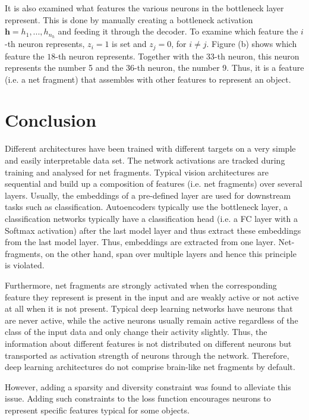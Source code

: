 It is also examined what features the various neurons in the bottleneck layer represent.
This is done by manually creating a bottleneck activation $\boldsymbol{h} = h_1, ..., h_{n_h}$ and feeding it through the decoder.
To examine which feature the $i$-th neuron represents, $z_i=1$ is set and $z_{j}=0$, for $i \neq j$.
Figure  (b) shows which feature the $18$-th neuron represents. Together with the $33$-th neuron, this neuron represents the number 5 and the $36$-th neuron, the number 9.
Thus, it is a feature (i.e. a net fragment) that assembles with other features to represent an object.

\section{Conclusion}
Different architectures have been trained with different targets on a very simple and easily interpretable data set.
The network activations are tracked during training and analysed for net fragments.
Typical vision architectures are sequential and build up a composition of features (i.e. net fragments) over several layers.
Usually, the embeddings of a pre-defined layer are used for downstream tasks such as classification.
Autoencoders typically use the bottleneck layer, a classification networks typically have a classification head (i.e. a FC layer with a Softmax activation) after the last model layer and thus extract these embeddings from the last model layer.
Thus, embeddings are extracted from one layer.
Net-fragments, on the other hand, span over multiple layers and hence this principle is violated.

Furthermore, net fragments are strongly activated when the corresponding feature they represent is present in the input and are weakly active or not active at all when it is not present.
Typical deep learning networks have neurons that are never active, while the active neurons usually remain active regardless of the class of the input data and only change their activity slightly.
Thus, the information about different features is not distributed on different neurons but transported as activation strength of neurons through the network.
Therefore, deep learning architectures do not comprise brain-like net fragments by default.

However, adding a sparsity and diversity constraint was found to alleviate this issue.
Adding such constraints to the loss function encourages neurons to represent specific features typical for some objects.
